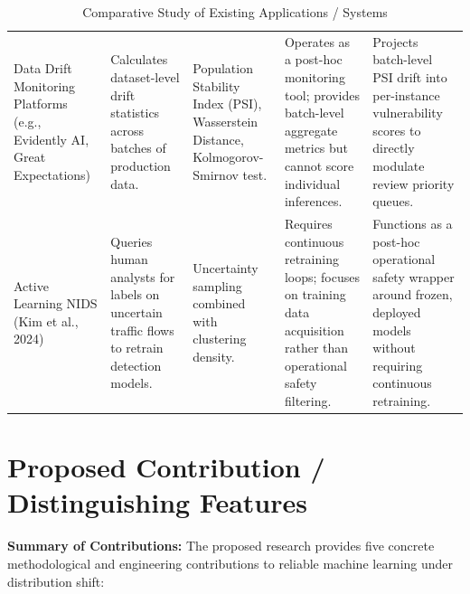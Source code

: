 \begin{table}[H]
\begin{tabular}{p{} p{} p{} p{} p{}}
Data Drift Monitoring Platforms (e.g., Evidently AI, Great Expectations) & Calculates dataset-level drift statistics across batches of production data. & Population Stability Index (PSI), Wasserstein Distance, Kolmogorov-Smirnov test. & Operates as a post-hoc monitoring tool; provides batch-level aggregate metrics but cannot score individual inferences. & Projects batch-level PSI drift into per-instance vulnerability scores to directly modulate review priority queues. \\
Active Learning NIDS (Kim et al., 2024) & Queries human analysts for labels on uncertain traffic flows to retrain detection models. & Uncertainty sampling combined with clustering density. & Requires continuous retraining loops; focuses on training data acquisition rather than operational safety filtering. & Functions as a post-hoc operational safety wrapper around frozen, deployed models without requiring continuous retraining. \\
\bottomrule
\end{tabular}
\caption{Comparative Study of Existing Applications / Systems}
\end{table}

\section{Proposed Contribution / Distinguishing Features}

\textbf{Summary of Contributions:} The proposed research provides five concrete methodological and engineering contributions to reliable machine learning under distribution shift:

